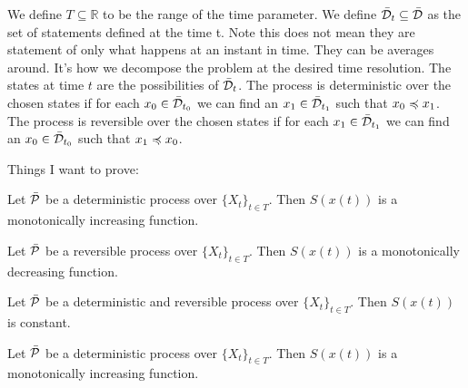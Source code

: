 \documentclass[letterpaper]{article}
\begin{document}
We define $T \subseteq \mathbb{R}$ to be the range of the time parameter. We define $\tdomain_{t} \subseteq \tdomain$ as the set of statements defined at the time t. Note this does not mean they are statement of only what happens at an instant in time. They can be averages around. It's how we decompose the problem at the desired time resolution. The states at time $t$ are the possibilities of $\tdomain_t$. The process is deterministic over the chosen states if for each $x_0 \in \tdomain_{t_0}$ we can find an $x_1 \in \tdomain_{t_1}$ such that $x_0 \narrower x_1$.  The process is reversible over the chosen states if for each $x_1 \in \tdomain_{t_1}$ we can find an $x_0 \in \tdomain_{t_0}$ such that $x_1 \narrower x_0$.

Things I want to prove:

\begin{prop}
	Let $\tdomain[P]$ be a deterministic process over $\{X_t\}_{t \in T}$. Then $S(x(t))$ is a monotonically increasing function.
\end{prop}

\begin{prop}
	Let $\tdomain[P]$ be a reversible process over $\{X_t\}_{t \in T}$. Then $S(x(t))$ is a monotonically decreasing function.
\end{prop}

\begin{prop}
	Let $\tdomain[P]$ be a deterministic and reversible process over $\{X_t\}_{t \in T}$. Then $S(x(t))$ is constant.
\end{prop}

\begin{prop}
	Let $\tdomain[P]$ be a deterministic process over $\{X_t\}_{t \in T}$. Then $S(x(t))$ is a monotonically increasing function.
\end{prop}


\end{document}
